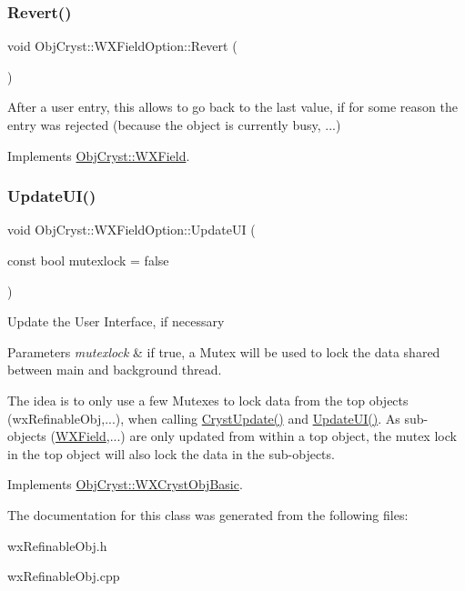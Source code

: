 \subsubsection{\texorpdfstring{Revert()}{Revert()}}
{\footnotesize\ttfamily void Obj\+Cryst\+::\+W\+X\+Field\+Option\+::\+Revert (\begin{DoxyParamCaption}{ }\end{DoxyParamCaption})\hspace{0.3cm}{\ttfamily [virtual]}}

After a user entry, this allows to go back to the last value, if for some reason the entry was rejected (because the object is currently busy, ...) 

Implements \mbox{\hyperlink{class_obj_cryst_1_1_w_x_field_a178d6d770d1e3adfa02e27da94b2dffa}{Obj\+Cryst\+::\+W\+X\+Field}}.

\mbox{\label{class_obj_cryst_1_1_w_x_field_option_ad0255d70605865c5f54afb20bc3b5c41}} 
\subsubsection{\texorpdfstring{UpdateUI()}{UpdateUI()}}
{\footnotesize\ttfamily void Obj\+Cryst\+::\+W\+X\+Field\+Option\+::\+Update\+UI (\begin{DoxyParamCaption}\item[{const bool}]{mutexlock = {\ttfamily false} }\end{DoxyParamCaption})\hspace{0.3cm}{\ttfamily [virtual]}}

Update the User Interface, if necessary


\begin{DoxyParams}{Parameters}
{\em mutexlock} & if true, a Mutex will be used to lock the data shared between main and background thread.\\
\hline
\end{DoxyParams}
The idea is to only use a few Mutexes to lock data from the top objects (wx\+Refinable\+Obj,...), when calling \mbox{\hyperlink{class_obj_cryst_1_1_w_x_field_option_a311178af180f6e17dbf3de43dac50130}{Cryst\+Update()}} and \mbox{\hyperlink{class_obj_cryst_1_1_w_x_field_option_ad0255d70605865c5f54afb20bc3b5c41}{Update\+U\+I()}}. As sub-\/objects (\mbox{\hyperlink{class_obj_cryst_1_1_w_x_field}{W\+X\+Field}},...) are only updated from within a top object, the mutex lock in the top object will also lock the data in the sub-\/objects. 

Implements \mbox{\hyperlink{class_obj_cryst_1_1_w_x_cryst_obj_basic_a3818940b7031ff7e45cf2178c4a99c90}{Obj\+Cryst\+::\+W\+X\+Cryst\+Obj\+Basic}}.



The documentation for this class was generated from the following files\+:\begin{DoxyCompactItemize}
\item 
wx\+Refinable\+Obj.\+h\item 
wx\+Refinable\+Obj.\+cpp\end{DoxyCompactItemize}
